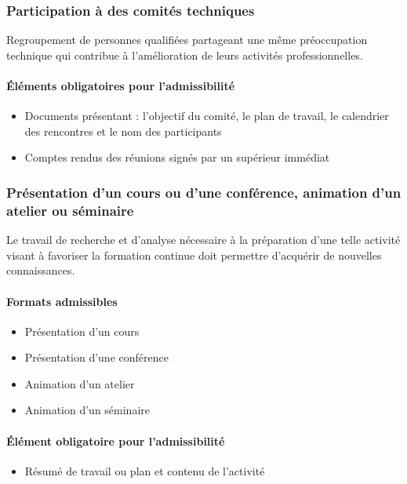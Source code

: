 		\subsubsection{Participation à des comités techniques}
		Regroupement de personnes qualifiées partageant une même préoccupation technique qui contribue à l’amélioration de leurs activités professionnelles.

		\paragraph{Éléments obligatoires pour l’admissibilité}
		\begin{itemize}
			\item Documents présentant : l’objectif du comité, le plan de travail, le calendrier des rencontres et le nom des participants
			\item Comptes rendus des réunions signés par un supérieur immédiat
		\end{itemize}

		
		\subsubsection[Présentation d'un(e) cours/conférence, animation d'atelier/séminaire]{Présentation d'un cours ou d'une conférence,  animation d'un atelier ou séminaire}
		Le travail de recherche et d’analyse nécessaire à la préparation d’une telle activité visant à favoriser la formation continue doit permettre d’acquérir de nouvelles connaissances.

		\paragraph{Formats admissibles}
		\begin{itemize}
			\item Présentation d’un cours
			\item Présentation d’une conférence 
			\item Animation d’un atelier
			\item Animation d’un séminaire
		\end{itemize}

		\paragraph{Élément obligatoire pour l’admissibilité}
		\begin{itemize}
			\item Résumé de travail ou plan et contenu de l’activité
		\end{itemize}		
		
